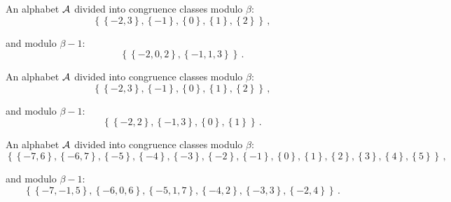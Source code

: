 \begin{exmp}
\label{ex:integerAJ}

An alphabet $\mathcal{A}$ divided into congruence classes modulo $\beta$: 
$$ \left\{\left\{-2, 3\right\}, \left\{-1\right\}, \left\{0\right\}, \left\{1\right\}, \left\{2\right\}\right\} \,,$$

and modulo $\beta - 1$: $$ \left\{\left\{-2, 0, 2\right\}, \left\{-1, 1, 3\right\}\right\} \,.$$

\end{exmp}


\begin{exmp}
\label{ex:integerAK}

An alphabet $\mathcal{A}$ divided into congruence classes modulo $\beta$: 
$$ \left\{\left\{-2, 3\right\}, \left\{-1\right\}, \left\{0\right\}, \left\{1\right\}, \left\{2\right\}\right\} \,,$$

and modulo $\beta - 1$: $$ \left\{\left\{-2, 2\right\}, \left\{-1, 3\right\}, \left\{0\right\}, \left\{1\right\}\right\} \,.$$

\end{exmp}



\begin{exmp}
\label{ex:integerAO}

An alphabet $\mathcal{A}$ divided into congruence classes modulo $\beta$: 
$$ \left\{\left\{-7, 6\right\}, \left\{-6, 7\right\}, \left\{-5\right\}, \left\{-4\right\}, \left\{-3\right\}, \left\{-2\right\}, \left\{-1\right\}, \left\{0\right\}, \left\{1\right\}, \left\{2\right\}, \left\{3\right\}, \left\{4\right\}, \left\{5\right\}\right\} \,,$$

and modulo $\beta - 1$: $$ \left\{\left\{-7, -1, 5\right\}, \left\{-6, 0, 6\right\}, \left\{-5, 1, 7\right\}, \left\{-4, 2\right\}, \left\{-3, 3\right\}, \left\{-2, 4\right\}\right\} \,.$$

\end{exmp}



%
%
%


